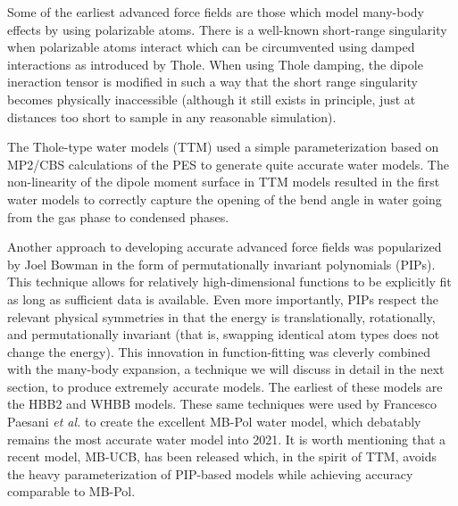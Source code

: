 \documentclass[11pt, proquest]{uwthesis}[2020/02/24]
\let\ce\ch
\begin{document}
\par Some of the earliest advanced force fields are those which model many-body effects by using polarizable atoms. There is a well-known short-range singularity when polarizable atoms interact which can be circumvented using damped interactions as introduced by Thole\autocite{thole_molecular_1981}. When using Thole damping, the dipole ineraction tensor is modified in such a way that the short range singularity becomes physically inaccessible (although it still exists in principle, just at distances too short to sample in any reasonable simulation).

\par The Thole-type water models (TTM) used a simple parameterization based on MP2/CBS calculations of the \ce{(H2O)2} PES to generate quite accurate water models\autocite{burnham_development_2002,burnham_development_2002-1,fanourgakis_flexible_2006,fanourgakis_development_2008}. The non-linearity of the dipole moment surface in TTM models resulted in the first water models to correctly capture the opening of the bend angle in water going from the gas phase to condensed phases\autocite{fanourgakis_bend_2006}.

\par Another approach to developing accurate advanced force fields was popularized by Joel Bowman in the form of permutationally invariant polynomials (PIPs)\autocite{braams_permutationally_2009}. This technique allows for relatively high-dimensional functions to be explicitly fit as long as sufficient data is available. Even more importantly, PIPs respect the relevant physical symmetries in that the energy is translationally, rotationally, and permutationally invariant (that is, swapping identical atom types does not change the energy). This innovation in function-fitting was cleverly combined with the many-body expansion, a technique we will discuss in detail in the next section, to produce extremely accurate models. The earliest of these models are the HBB2\autocite{huang_ab_2006} and WHBB\autocite{wang_full-dimensional_2009} models. These same techniques were used by Francesco Paesani \textit{et al.} to create the excellent MB-Pol water model\autocite{babin_toward_2012, babin_development_2013, babin_development_2013-1, babin_development_2014}, which debatably remains the most accurate water model into 2021. It is worth mentioning that a recent model, MB-UCB\autocite{das_development_2019}, has been released which, in the spirit of TTM, avoids the heavy parameterization of PIP-based models while achieving accuracy comparable to MB-Pol.
\end{document}

